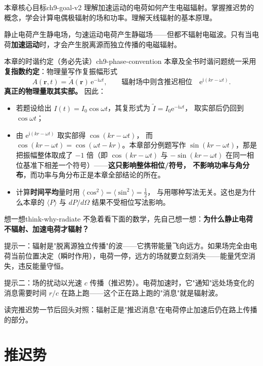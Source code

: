 \documentclass[11pt,a4paper,openany,oneside]{book}
\newcommand{\ii}{\mathrm{i}}
\newcommand{\ee}{\mathrm{e}}
\newcommand{\vect}[1]{\bm{#1}}
\begin{document}
\hypertarget{ch9-goal}{}\begin{insight}{本章核心目标}{ch9-goal-v2}
理解加速运动的电荷如何产生电磁辐射。掌握推迟势的概念，学会计算电偶极辐射的场和功率。理解天线辐射的基本原理。
\end{insight}

静止电荷产生静电场，匀速运动电荷产生静磁场——但都不辐射电磁波。只有当电荷\textbf{加速运动}时，才会产生脱离源而独立传播的电磁辐射。

\begin{tip}{本章的时谐约定（务必先读）}{ch9-phase-convention}
本章及全书时谐问题统一采用\textbf{复指数约定}：物理量写作复振幅形式
\[
A(\vect{r},t) = \tilde{A}(\vect{r})\,\ee^{-\ii\omega t},
\qquad\text{辐射场中则含推迟相位}\quad \ee^{\ii(kr-\omega t)} .
\]
\textbf{真正的物理量取其实部。} 因此：
\begin{itemize}[nosep]
\item 若题设给出 $I(t) = I_0\cos\omega t$，其复形式为 $\tilde{I} = I_0\ee^{-\ii\omega t}$，
  取实部后仍回到 $\cos\omega t$；
\item 由 $\ee^{\ii(kr-\omega t)}$ 取实部得 $\cos(kr-\omega t)$，
  而 $\cos(kr-\omega t) = \cos(\omega t - kr)$。本章部分例题写作
  $\sin(kr-\omega t)$，那是把振幅整体取成了 $-1$ 倍（即 $\cos(kr-\omega t)$ 与
  $-\sin(kr-\omega t)$ 在同一相位基准下相差一个符号）——\textbf{这只影响整体相位/符号，
  不影响功率与角分布}，而功率与角分布正是本章全部结论的所在。
\item 计算\textbf{时间平均}量时用 $\langle\cos^2\rangle = \langle\sin^2\rangle = \tfrac12$，
  与用哪种写法无关。这也是为什么本章的 $\langle P\rangle$ 与 $dP/d\Omega$ 结果不受相位写法影响。
\end{itemize}
\end{tip}

\begin{tip}{想一想}{think-why-radiate}
不急着看下面的数学，先自己想一想：\textbf{为什么静止电荷不辐射、加速电荷才辐射？}

提示一：辐射是"脱离源独立传播"的波——它携带能量飞向远方。如果场完全由电荷当前位置决定（瞬时作用），电荷一停，远方的场就要立刻消失——能量凭空消失，违反能量守恒。

提示二：场的扰动以光速 $c$ 传播（推迟势）。电荷加速时，它"通知"远处场变化的消息需要时间 $r/c$ 在路上跑——这个正在路上跑的"消息"就是辐射波。

读完推迟势一节后回头对照：辐射正是"推迟消息"在电荷停止加速后仍在路上传播的部分。
\end{tip}

\section{推迟势}
\end{document}
